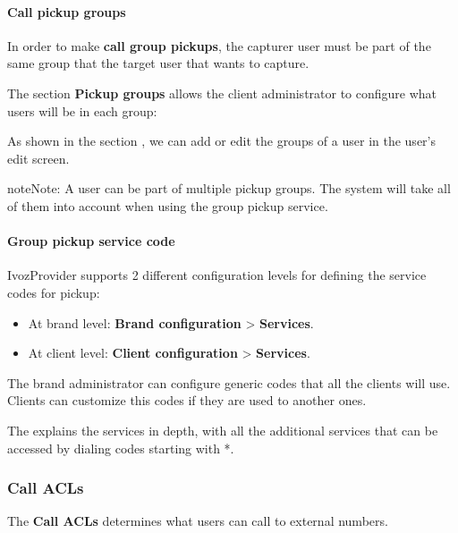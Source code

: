 \documentclass[letterpaper,10pt,english]{sphinxmanual}
\begin{document}
\paragraph{Call pickup groups}
\label{administration_portal/client/vpbx/user_configuration/pick_up_groups:call-pickup-groups}
In order to make \textbf{call group pickups}, the capturer user must be part of the
same group that the target user that wants to capture.

The section \textbf{Pickup groups} allows the client administrator to configure
what users will be in each group:

As shown in the section {\hyperref[administration_portal/client/vpbx/users:users]{}}, we can add or edit the groups of a user
in the user's edit screen.

\begin{notice}{note}{Note:}
A user can be part of multiple pickup groups. The system will take
all of them into account when using the group pickup service.
\end{notice}


\paragraph{Group pickup service code}
\label{administration_portal/client/vpbx/user_configuration/pick_up_groups:group-pickup-service-code}
IvozProvider supports 2 different configuration levels for defining the service
codes for pickup:
\begin{itemize}
\item {} 
At brand level: \textbf{Brand configuration} \textgreater{} \textbf{Services}.

\item {} 
At client level: \textbf{Client configuration} \textgreater{} \textbf{Services}.

\end{itemize}

The brand administrator can configure generic codes that all the clients will
use. Clients can customize this codes if they are used to another ones.

The {\hyperref[administration_portal/platform/services:services]{}} explains the services in depth, with
all the additional services that can be accessed by dialing codes starting with
*.


\subsubsection{Call ACLs}
\label{administration_portal/client/vpbx/user_configuration/call_acls:call-permissions}\label{administration_portal/client/vpbx/user_configuration/call_acls::doc}\label{administration_portal/client/vpbx/user_configuration/call_acls:call-acls}
The \textbf{Call ACLs} determines what users can call to external numbers.
\end{document}
